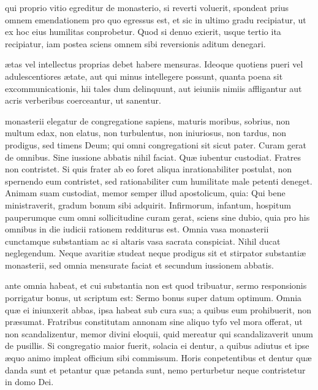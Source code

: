 \documentclass[fontsize=9pt,paper=A6,twoside,BCOR=1mm,DIV=22,headinclude]{scrarticle}
\begin{document}
\begin{multicols}{2}
 qui proprio vitio egreditur de monasterio, si reverti voluerit, spondeat prius omnem emendationem pro quo egressus est, et sic in ultimo gradu recipiatur, ut ex hoc eius humilitas conprobetur. Quod si denuo exierit, usque tertio ita recipiatur, iam postea sciens omnem sibi reversionis aditum denegari. 

 ætas vel intellectus proprias debet habere mensuras. Ideoque quotiens pueri vel adulescentiores ætate, aut qui minus intellegere possunt, quanta poena sit excommunicationis, hii tales dum delinquunt, aut ieiuniis nimiis affligantur aut acris verberibus coerceantur, ut sanentur. 

 monasterii elegatur de congregatione sapiens, maturis moribus, sobrius, non multum edax, non elatus, non turbulentus, non iniuriosus, non tardus, non prodigus, sed timens Deum; qui omni congregationi sit sicut pater. Curam gerat de omnibus. Sine iussione abbatis nihil faciat. Quæ iubentur custodiat. Fratres non contristet. Si quis frater ab eo foret aliqua inrationabiliter postulat, non spernendo eum contristet, sed rationabiliter cum humilitate male petenti deneget. Animam suam custodiat, memor semper illud apostolicum, quia: Qui bene ministraverit, gradum bonum sibi adquirit. Infirmorum, infantum, hospitum pauperumque cum omni sollicitudine curam gerat, sciens sine dubio, quia pro his omnibus in die iudicii rationem redditurus est. Omnia vasa monasterii cunctamque substantiam ac si altaris vasa sacrata conspiciat. Nihil ducat neglegendum. Neque avaritiæ studeat neque prodigus sit et stirpator substantiæ monasterii, sed omnia mensurate faciat et secundum iussionem abbatis.

 ante omnia habeat, et cui substantia non est quod tribuatur, sermo responsionis porrigatur bonus, ut scriptum est: Sermo bonus super datum optimum. Omnia quæ ei iniunxerit abbas, ipsa habeat sub cura sua; a quibus eum prohibuerit, non præsumat. Fratribus constitutam annonam sine aliquo tyfo vel mora offerat, ut non scandalizentur, memor divini eloquii, quid mereatur qui scandalizaverit unum de pusillis. Si congregatio maior fuerit, solacia ei dentur, a quibus adiutus et ipse æquo animo impleat officium sibi commissum. Horis conpetentibus et dentur quæ danda sunt et petantur quæ petanda sunt, nemo perturbetur neque contristetur in domo Dei.


\end{multicols}
\end{document}
